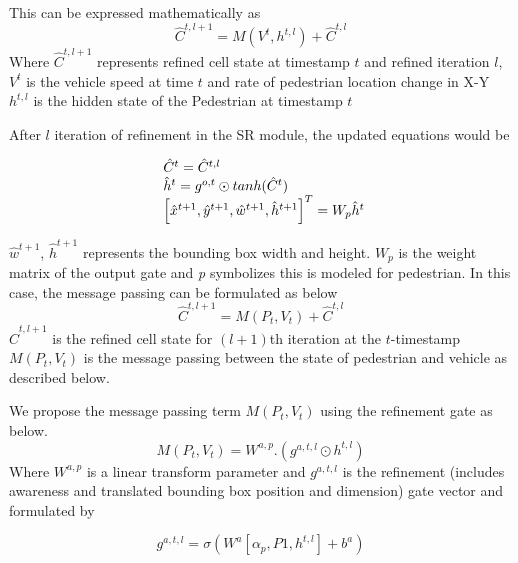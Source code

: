 %
This can be expressed mathematically as
\begin{equation}
\hat{C}^{t, l+1}= M(V^t, {h}^{t, l}) + \hat{C}^{t, l}
\end{equation}
Where $\hat{C}^{t, l+1}$ represents refined cell state at timestamp $t$ and refined iteration $l$, $V^t$ is the vehicle speed at time $t$ and rate of pedestrian location change in X-Y \\
${h}^{t, l}$ is the hidden state of the Pedestrian at timestamp $t$

After $l$ iteration of refinement in the SR module, the updated equations would be

\begin{equation}
\begin{array}{l@{}}
\hat{C}^{t}=\hat{C}^{t, l} \\
\hat{h}^{t}={g}^{o,t} \odot tanh(\hat{C}^{t}) \\
\left[ \hat{x}^{t+1}, \hat{y}^{t+1}, \hat{w}^{t+1}, \hat{h}^{t+1} \right] ^ T = W_p\hat{h}^{t}
\end{array}
\end{equation}

$\hat{w}^{t+1}$, $\hat{h}^{t+1}$ represents the bounding box width and height.
$W_p$ is the weight matrix of the output gate and \textit{p} symbolizes this is modeled for pedestrian.
%
In this case, the message passing can be formulated as below 
\begin{equation}
\hat{C}^{t, l+1}=M(P_t, V_t) +  \hat{C}^{t, l}
\end{equation}
$\hat{C}^{t, l+1}$ is the refined cell state for $(l+1)$th iteration at the $t$-timestamp \\
$M(P_t, V_t)$ is the message passing between the state of pedestrian and vehicle as described below.

We propose the message passing term $M(P_t, V_t)$ using the refinement gate as below.
\begin{equation}
M(P_t, V_t) = W^{a,p}.(g^{a,t,l} \odot {h}^{t, l} ) 
\end{equation}
Where $W^{a,p}$ is a linear transform parameter and $g^{a,t,l}$ is the refinement (includes awareness and translated bounding box position and dimension) gate vector and formulated by

\begin{equation}
g^{a,t,l} = \sigma(W^{a} [ \alpha_p, P1, {h}^{t, l} ] + b^{a} ) 
\end{equation}

